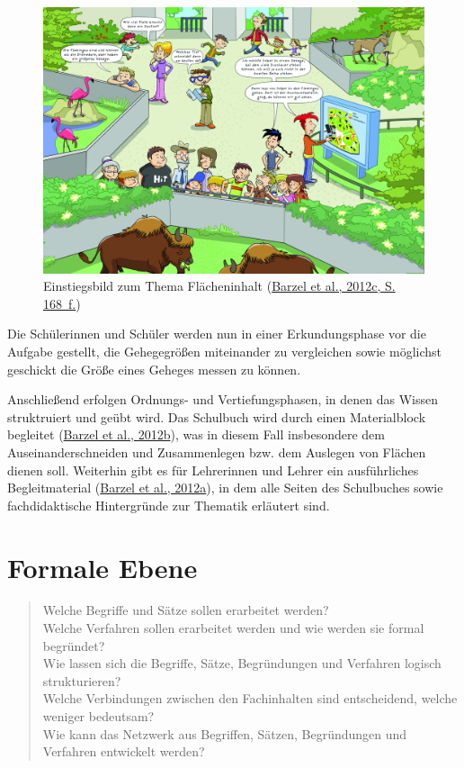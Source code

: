 \documentclass[
  ngerman,
]{scrbook}
\theoremstyle{definition}
\theoremstyle{definition}
\theoremstyle{definition}
\theoremstyle{definition}
\theoremstyle{remark}
\begin{document}
\begin{figure}

{\centering \includegraphics[width=1\linewidth]{pictures/5-Tiergehege} 

}

\caption{Einstiegsbild zum Thema Flächeninhalt (\protect\hyperlink{ref-Barzel2012}{Barzel et al., 2012c, S. 168~f.})}\label{fig:Tiergehege}
\end{figure}

Die Schülerinnen und Schüler werden nun in einer Erkundungsphase vor die Aufgabe gestellt, die Gehegegrößen miteinander zu vergleichen sowie möglichst geschickt die Größe eines Geheges messen zu können.

Anschließend erfolgen Ordnungs- und Vertiefungsphasen, in denen das Wissen struktruiert und geübt wird. Das Schulbuch wird durch einen Materialblock begleitet (\protect\hyperlink{ref-Barzel2012b}{Barzel et al., 2012b}), was in diesem Fall insbesondere dem Auseinanderschneiden und Zusammenlegen bzw. dem Auslegen von Flächen dienen soll. Weiterhin gibt es für Lehrerinnen und Lehrer ein ausführliches Begleitmaterial (\protect\hyperlink{ref-Barzel2012a}{Barzel et al., 2012a}), in dem alle Seiten des Schulbuches sowie fachdidaktische Hintergründe zur Thematik erläutert sind.

\hypertarget{formale-ebene-1}{%
\section{Formale Ebene}\label{formale-ebene-1}}

\begin{quote}
Welche Begriffe und Sätze sollen erarbeitet werden?\\
Welche Verfahren sollen erarbeitet werden und wie werden sie formal begründet?\\
Wie lassen sich die Begriffe, Sätze, Begründungen und Verfahren logisch strukturieren?\\
Welche Verbindungen zwischen den Fachinhalten sind entscheidend, welche weniger bedeutsam?\\
Wie kann das Netzwerk aus Begriffen, Sätzen, Begründungen und Verfahren entwickelt werden?
\end{quote}
\end{document}
